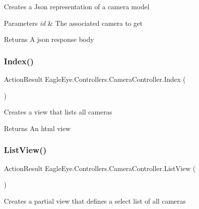 Creates a Json representation of a camera model 


\begin{DoxyParams}{Parameters}
{\em id} & The associated camera to get\\
\hline
\end{DoxyParams}
\begin{DoxyReturn}{Returns}
A json response body
\end{DoxyReturn}
\mbox{\label{class_eagle_eye_1_1_controllers_1_1_camera_controller_aef90502fd5923368a7ef1773280e4b32}} 
\subsubsection{\texorpdfstring{Index()}{Index()}}
{\footnotesize\ttfamily Action\+Result Eagle\+Eye.\+Controllers.\+Camera\+Controller.\+Index (\begin{DoxyParamCaption}{ }\end{DoxyParamCaption})}



Creates a view that lists all cameras 

\begin{DoxyReturn}{Returns}
An html view
\end{DoxyReturn}
\mbox{\label{class_eagle_eye_1_1_controllers_1_1_camera_controller_ae60e0235e0f741b4e102a7d1df22eed1}} 
\subsubsection{\texorpdfstring{ListView()}{ListView()}}
{\footnotesize\ttfamily Action\+Result Eagle\+Eye.\+Controllers.\+Camera\+Controller.\+List\+View (\begin{DoxyParamCaption}{ }\end{DoxyParamCaption})}



Creates a partial view that defines a select list of all cameras 

